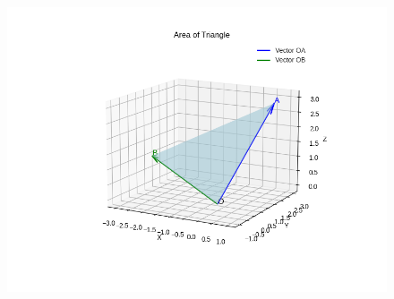 \documentclass{article}
\begin{document}
\begin{figure}[H]
    \centering
    \includegraphics[width=1\linewidth]{figs/Figure_1.png}
    \caption{}
    \label{fig:fig1}
\end{figure}
\end{document}
